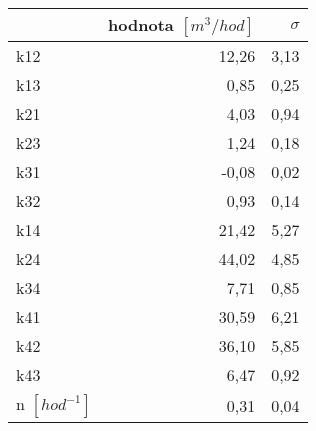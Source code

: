 \begin{tabular}{lrr}
\toprule
{} &  hodnota $\left[\si{m^3/hod}\right]$ &  $\sigma$ \\
\midrule
k12                 &                                12,26 &      3,13 \\
k13                 &                                 0,85 &      0,25 \\
k21                 &                                 4,03 &      0,94 \\
k23                 &                                 1,24 &      0,18 \\
k31                 &                                -0,08 &      0,02 \\
k32                 &                                 0,93 &      0,14 \\
k14                 &                                21,42 &      5,27 \\
k24                 &                                44,02 &      4,85 \\
k34                 &                                 7,71 &      0,85 \\
k41                 &                                30,59 &      6,21 \\
k42                 &                                36,10 &      5,85 \\
k43                 &                                 6,47 &      0,92 \\
n $[\si{hod^{-1}}]$ &                                 0,31 &      0,04 \\
\bottomrule
\end{tabular}
